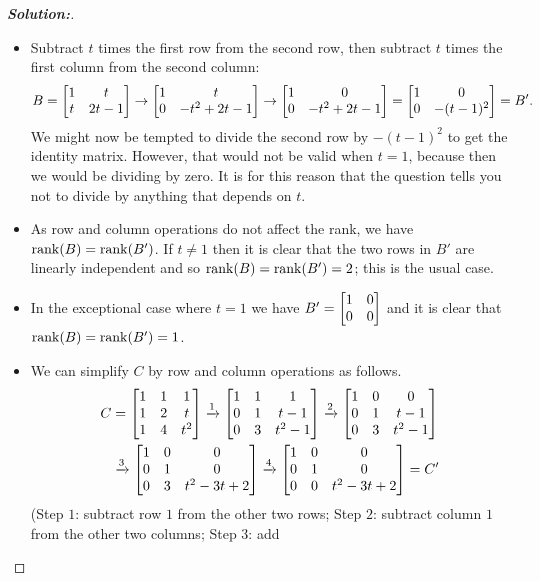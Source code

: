 \documentclass[a4paper]{amsart}
\theoremstyle{definition}
\newenvironment{solution}{\begin{proof}[\textbf{Solution:}] \vphantom{u}}{\end{proof}}
\begin{document}
\begin{solution}
 \begin{itemize}
  \item[(1)] Subtract $t$ times the first row from the second row,
   then subtract $t$ times the first column from the second column:
   \[ B =
      \left[\begin{matrix} 1&t \\ t&2t-1 \end{matrix}\right] \to 
      \left[\begin{matrix} 1&t \\ 0 & -t^2+2t-1 \end{matrix}\right] \to
      \left[\begin{matrix} 1&0 \\ 0 & -t^2+2t-1 \end{matrix}\right] = 
      \left[\begin{matrix} 1&0 \\ 0 & -(t-1)^2 \end{matrix}\right] = B'.
   \]
   We might now be tempted to divide the second row by $-(t-1)^2$ to
   get the identity matrix.  However, that would not be valid when
   $t=1$, because then we would be dividing by zero.  It is for this
   reason that the question tells you not to divide by anything that
   depends on $t$.
  \item[(2)] As row and column operations do not affect the rank, we
   have $\operatorname{rank}(B)=\operatorname{rank}(B')$.  If $t\neq 1$ then it is clear that the
   two rows in $B'$ are linearly independent and so
   $\operatorname{rank}(B)=\operatorname{rank}(B')=2$; this is the usual case.
  \item[(3)] In the exceptional case where $t=1$ we have
   $B'=\left[\begin{matrix} 1&0\\0&0\end{matrix}\right]$ and it is clear that $\operatorname{rank}(B)=\operatorname{rank}(B')=1$.
  \item[(4)] We can simplify $C$ by row and column operations as
   follows. 
   \begin{align*}
     C &= 
      \left[\begin{matrix} 1 & 1 & 1 \\
           1 & 2 & t \\
           1 & 4 & t^2 \end{matrix}\right] \xrightarrow{1}
      \left[\begin{matrix} 1 & 1 & 1 \\
           0 & 1 & t-1 \\
           0 & 3 & t^2-1 \end{matrix}\right] \xrightarrow{2}
      \left[\begin{matrix} 1 & 0 & 0 \\
           0 & 1 & t-1 \\
           0 & 3 & t^2-1 \end{matrix}\right] \\
      &\xrightarrow{3}
      \left[\begin{matrix} 1 & 0 & 0 \\
           0 & 1 & 0 \\
           0 & 3 & t^2-3t+2 \end{matrix}\right] \xrightarrow{4}
      \left[\begin{matrix} 1 & 0 & 0 \\
           0 & 1 & 0 \\
           0 & 0 & t^2-3t+2 \end{matrix}\right] = C'
   \end{align*}
   (Step $1$: subtract row $1$ from the other two rows; Step $2$:
   subtract column $1$ from the other two columns; Step $3$: add

\end{itemize}
\end{solution}
\end{document}

